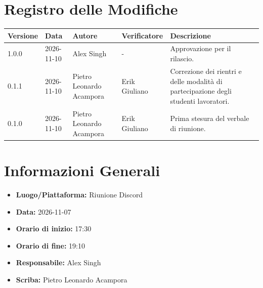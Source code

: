 \documentclass[a4paper, 11pt]{article}
\begin{document}
\section*{Registro delle Modifiche}
\vspace{0.5cm}
\begin{center}
\renewcommand{\arraystretch}{1.5}
\begin{tabularx}{\textwidth}{|l|l|>{\raggedright\arraybackslash}p{3.5cm}|>{\raggedright\arraybackslash}p{3.5cm}|X|}
\hline
\textbf{Versione} & \textbf{Data} & \textbf{Autore} & \textbf{Verificatore} & \textbf{Descrizione} \\ \hline
1.0.0 & 2026-11-10 & Alex Singh & - & Approvazione per il
rilascio.\\ \hline
0.1.1 & 2026-11-10 & Pietro Leonardo Acampora & Erik Giuliano & Correzione dei rientri e delle modalità di partecipazione degli studenti lavoratori. \\ \hline
0.1.0 & 2026-11-10 & Pietro Leonardo Acampora & Erik Giuliano & Prima stesura del verbale di riunione. \\ \hline
\end{tabularx}
\end{center}

\newpage

\tableofcontents
\newpage

\section{Informazioni Generali}
\begin{itemize}
    \item \textbf{Luogo/Piattaforma:} Riunione Discord
    \item \textbf{Data:} 2026-11-07
    \item \textbf{Orario di inizio:} 17:30
    \item \textbf{Orario di fine:} 19:10
    \item \textbf{Responsabile:} Alex Singh
    \item \textbf{Scriba:} Pietro Leonardo Acampora
\end{itemize}
\end{document}
